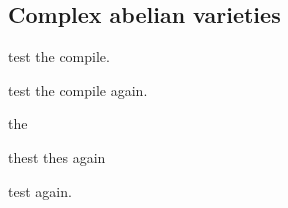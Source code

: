 \subsection{Complex abelian varieties}

test the compile.

test the compile again.

the

thest
thes again

test again.































